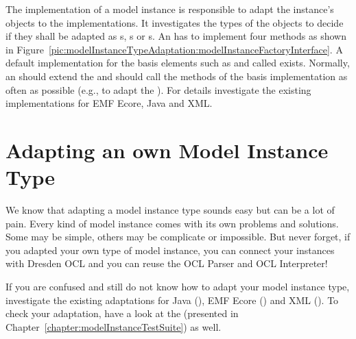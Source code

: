 The  implementation of a model instance is
responsible to adapt the instance's objects to the  
implementations. It investigates the types of the objects to decide if they
shall be adapted as s, 
s or
s. An  has
to implement four methods as shown in 
Figure~\ref{pic:modelInstanceTypeAdaptation:modelInstanceFactoryInterface}. A 
default implementation for the basis elements such as
 and  called 
 exists. Normally, an 
 should extend the 
 and should call the methods of
the basis implementation as often as possible (e.g., to adapt the 
). For details investigate the existing
implementations for \acs{EMF} Ecore, Java and \acs{XML}.



\section{Adapting an own Model Instance Type}

We know that adapting a model instance type sounds easy but can be a lot
of pain. Every kind of model instance comes with its own problems and
solutions. Some may be simple, others may be complicate or impossible. But never
forget, if you adapted your own type of model instance, you can connect your
instances with Dresden OCL and you can reuse the OCL Parser and OCL Interpreter!

If you are confused and still do not know how to adapt your model instance type,
investigate the existing adaptations for Java
(), \acs{EMF} Ecore
() and \acs{XML}
(). To check your
adaptation, have a look at the  (presented in Chapter~\ref{chapter:modelInstanceTestSuite}) as well.
